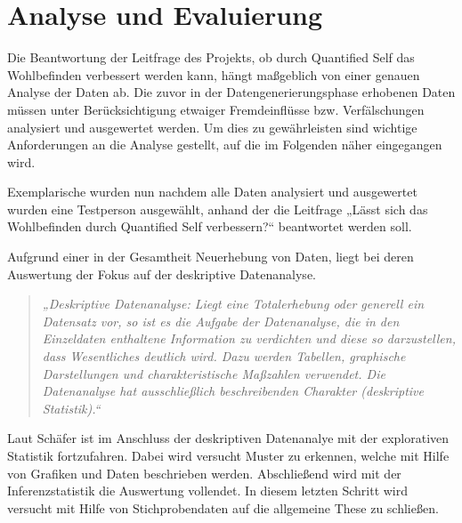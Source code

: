 
\chapter{Analyse und Evaluierung}
\label{ch:AnalyseUndEvaluierung}

Die Beantwortung der Leitfrage des Projekts, ob durch Quantified Self das Wohlbefinden verbessert werden kann, hängt maßgeblich von einer genauen Analyse der Daten ab. 
Die zuvor in der Datengenerierungsphase erhobenen Daten müssen unter Berücksichtigung etwaiger Fremdeinflüsse bzw. Verfälschungen analysiert und ausgewertet werden.
Um dies zu gewährleisten sind wichtige Anforderungen an die Analyse gestellt, auf die im Folgenden näher eingegangen wird.

Exemplarische wurden nun nachdem alle Daten analysiert und ausgewertet wurden eine Testperson ausgewählt, anhand der die Leitfrage „Lässt sich das Wohlbefinden durch Quantified Self verbessern?“ beantwortet werden soll.

Aufgrund einer in der Gesamtheit Neuerhebung von Daten, liegt bei deren Auswertung der Fokus auf der deskriptive Datenanalyse.

\begin{quote}
\textit{„Deskriptive Datenanalyse: Liegt eine Totalerhebung oder generell ein Datensatz vor, so ist es die Aufgabe der Datenanalyse, die in den Einzeldaten enthaltene Information zu verdichten und diese so darzustellen, dass Wesentliches deutlich wird. Dazu werden Tabellen, graphische Darstellungen und charakteristische Maßzahlen verwendet.  Die Datenanalyse hat ausschließlich beschreibenden Charakter (deskriptive Statistik).“} 
\end{quote}
\cite[Springer Gabler Wirtschaftslexikon]{web:SpringerDatenanalyse}


Laut Schäfer\cite{Schafer2010} ist im Anschluss der deskriptiven Datenanalye mit der explorativen Statistik fortzufahren.
Dabei wird versucht Muster zu erkennen, welche mit Hilfe von Grafiken und Daten beschrieben werden.
Abschließend wird mit der Inferenzstatistik die Auswertung vollendet.
In diesem letzten Schritt wird versucht mit Hilfe von Stichprobendaten auf die allgemeine These zu schließen.


